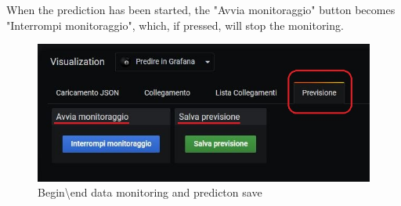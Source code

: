 When the prediction has been started, the "Avvia monitoraggio" button becomes "Interrompi monitoraggio", which, if pressed, will stop the monitoring.

\begin{figure}[H]
\centering
\includegraphics[scale=0.50]{img/plug-in/save_previsione.jpg}
\caption{Begin\textbackslash end data monitoring and predicton save}
\end{figure} 
 

